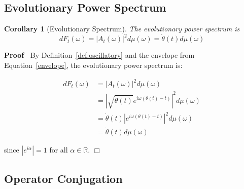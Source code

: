 \documentclass{article}
\newenvironment{proof}{\noindent\textbf{Proof\ }}{\hspace*{\fill}$\Box$\medskip}
\newtheorem{corollary}{Corollary}
\begin{document}
\subsection{Evolutionary Power Spectrum}

\begin{corollary}
  [Evolutionary Spectrum]\label{cor:evolving_spec} The evolutionary power
  spectrum is
  \begin{equation}
    \label{eq:evolutionary_spec} dF_t (\omega) = |A_t (\omega) |^2 d \mu
    (\omega) = \dot{\theta} (t) d \mu (\omega)
  \end{equation}
\end{corollary}

\begin{proof}
  By Definition~\ref{def:oscillatory} and the envelope from
  Equation~\eqref{envelope}, the evolutionary power spectrum is:
  
  \begin{align}
    dF_t (\omega) & = |A_t (\omega) |^2 d \mu (\omega) \\
    & = \left| \sqrt{\dot{\theta} (t)} e^{i \omega (\theta (t) - t)}
    \right|^2 d \mu (\omega) \\
    & = \dot{\theta} (t) |e^{i \omega (\theta (t) - t)} |^2 d \mu (\omega) \\
    & = \dot{\theta} (t) d \mu (\omega) 
  \end{align}
  
  since $|e^{i \alpha} | = 1$ for all $\alpha \in \mathbb{R}$.
\end{proof}

\subsection{Operator Conjugation}
\end{document}
